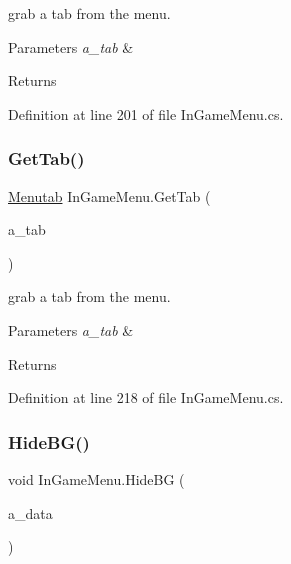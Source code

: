 grab a tab from the menu. 


\begin{DoxyParams}{Parameters}
{\em a\+\_\+tab} & \\
\hline
\end{DoxyParams}
\begin{DoxyReturn}{Returns}

\end{DoxyReturn}


Definition at line 201 of file In\+Game\+Menu.\+cs.

\mbox{\label{class_in_game_menu_a41c4b21e038abe4744bf9be44b391fbb}} 
\subsubsection{\texorpdfstring{Get\+Tab()}{GetTab()}\hspace{0.1cm}{\footnotesize\ttfamily [2/2]}}
{\footnotesize\ttfamily \mbox{\hyperlink{class_in_game_menu_1_1_menutab}{Menutab}} In\+Game\+Menu.\+Get\+Tab (\begin{DoxyParamCaption}\item[{\mbox{\hyperlink{_in_game_menu_8cs_a87eb828d74fde9afa783aa42bfe61b96}{Tab\+Name}}}]{a\+\_\+tab }\end{DoxyParamCaption})}



grab a tab from the menu. 


\begin{DoxyParams}{Parameters}
{\em a\+\_\+tab} & \\
\hline
\end{DoxyParams}
\begin{DoxyReturn}{Returns}

\end{DoxyReturn}


Definition at line 218 of file In\+Game\+Menu.\+cs.

\mbox{\label{class_in_game_menu_afe98d4174967693826139b12ac28938c}} 
\subsubsection{\texorpdfstring{Hide\+B\+G()}{HideBG()}}
{\footnotesize\ttfamily void In\+Game\+Menu.\+Hide\+BG (\begin{DoxyParamCaption}\item[{Pointer\+Event\+Data}]{a\+\_\+data }\end{DoxyParamCaption})}



